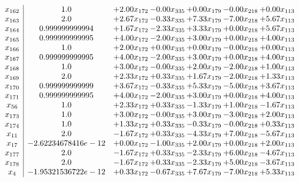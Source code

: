 \documentclass[8pt]{article}
\begin{document}
\[\begin{array}{c| c c@{\hskip 2pt} c@{\hskip 2pt} c@{\hskip 2pt} c@{\hskip 2pt} c@{\hskip 2pt} }
 x_{162}   &  1.0 & +  2.00 x_{172} & -0.00 x_{335} & +  0.00 x_{179} & -0.00 x_{218} & +  0.00 x_{113}\\
 x_{163}   &  2.0 & +  2.67 x_{172} & -0.33 x_{335} & +  7.33 x_{179} & -7.00 x_{218} & +  5.67 x_{113}\\
 x_{164}   &  0.999999999994 & +  1.67 x_{172} & -2.33 x_{335} & +  3.33 x_{179} & +  0.00 x_{218} & +  5.67 x_{113}\\
 x_{165}   &  0.999999999995 & +  4.00 x_{172} & -2.00 x_{335} & +  3.00 x_{179} & +  0.00 x_{218} & +  4.00 x_{113}\\
 x_{166}   &  1.0 & +  2.00 x_{172} & +  0.00 x_{335} & +  0.00 x_{179} & -0.00 x_{218} & +  0.00 x_{113}\\
 x_{167}   &  0.999999999995 & +  4.00 x_{172} & -2.00 x_{335} & +  3.00 x_{179} & +  0.00 x_{218} & +  4.00 x_{113}\\
 x_{168}   &  1.0 & +  3.00 x_{172} & -0.00 x_{335} & +  2.00 x_{179} & -2.00 x_{218} & +  1.00 x_{113}\\
 x_{169}   &  2.0 & +  2.33 x_{172} & +  0.33 x_{335} & +  1.67 x_{179} & -2.00 x_{218} & +  1.33 x_{113}\\
 x_{170}   &  0.999999999999 & +  3.67 x_{172} & -0.33 x_{335} & +  5.33 x_{179} & -5.00 x_{218} & +  3.67 x_{113}\\
 x_{171}   &  0.999999999995 & +  4.00 x_{172} & -2.00 x_{335} & +  3.00 x_{179} & +  0.00 x_{218} & +  4.00 x_{113}\\
 x_{56}   &  1.0 & +  2.33 x_{172} & +  0.33 x_{335} & -1.33 x_{179} & +  1.00 x_{218} & -1.67 x_{113}\\
 x_{173}   &  1.0 & +  3.00 x_{172} & -0.00 x_{335} & +  3.00 x_{179} & -3.00 x_{218} & +  2.00 x_{113}\\
 x_{174}   &  1.0 & +  1.33 x_{172} & +  0.33 x_{335} & -0.33 x_{179} & -0.00 x_{218} & +  0.33 x_{113}\\
 x_{11}   &  2.0 & -1.67 x_{172} & +  0.33 x_{335} & -4.33 x_{179} & +  7.00 x_{218} & -5.67 x_{113}\\
 x_{17}   &  -2.62234678416e-12 & +  0.00 x_{172} & -1.00 x_{335} & +  2.00 x_{179} & +  0.00 x_{218} & +  2.00 x_{113}\\
 x_{177}   &  2.0 & -1.67 x_{172} & +  0.33 x_{335} & -2.33 x_{179} & +  6.00 x_{218} & -4.67 x_{113}\\
 x_{178}   &  2.0 & -1.67 x_{172} & +  0.33 x_{335} & -2.33 x_{179} & +  5.00 x_{218} & -3.67 x_{113}\\
 x_{4}   &  -1.95321536722e-12 & +  0.33 x_{172} & -0.67 x_{335} & +  7.67 x_{179} & -7.00 x_{218} & +  5.33 x_{113}\\

\end{array}\]
\end{document}
